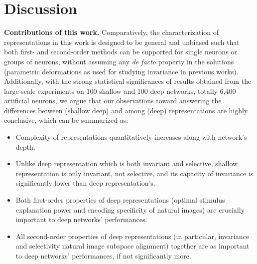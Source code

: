 \documentclass[10pt,twocolumn,letterpaper]{article}
\begin{document}

\section{Discussion}

{\bf Contributions of this work.} Comparatively, the characterization of representations in this work is designed to be general and unbiased such that both first- and second-order methods can be supported for single neurons or groups of neurons, without assuming any \emph{de facto} property in the solutions (\eg parametric deformations as used for studying invariance in previous works).
Additionally, with the strong statistical significances of results obtained from the large-scale experiments on 100 shallow and 100 deep networks, totally 6,400 artificial neurons, we argue that our observations toward answering the differences between (shallow \vs deep) and among (deep) representations are highly conclusive, which can be summarized as:
\begin{itemize} %
\setlength\itemsep{0.0ex}
\item Complexity of representations quantitatively increases along with network's depth.
\item Unlike deep representation which is both invariant and selective, shallow representation is only invariant, not selective, and its capacity of invariance is significantly lower than deep representation's.
\item Both first-order properties of deep representations (optimal stimulus explanation power and encoding specificity of natural images) are crucially important to deep networks' performances.
\item All second-order properties of deep representations (in particular, invariance and selectivity \vs natural image subspace alignment) together are as important to deep networks' performances, if not significantly more.
\end{itemize}
\end{document}
